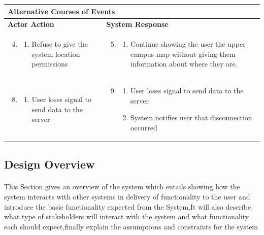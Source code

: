 \begin{longtable}{|p{}|p{}|}\hline
	\multicolumn{2}{|p{1.095\textwidth}|}{\textbf{Alternative Courses of Events}} \\\hline
	\textbf{Actor Action} & \textbf{System Response} \\\hline
	\begin{enumerate}
		\setcounter{enumi}{3}
		\item 
		\begin{enumerate}[series=abnormal0]
			\item Refuse to give the system location permissions
		\end{enumerate}
	\end{enumerate}
	&
	\begin{enumerate}[series=abnormal0]
		\setcounter{enumi}{4}
		\item
		\begin{enumerate}
			\item Continue showing the user the upper campus map without giving them information about where they are. 
		\end{enumerate}
	\end{enumerate} \\\hline
	\begin{enumerate}
		\setcounter{enumi}{7}
		\item 
		\begin{enumerate}[series=abnormal1]
			\item User loses signal to send data to the server
		\end{enumerate}
	\end{enumerate}
	&
	\begin{enumerate}
		\setcounter{enumi}{8}
		\item 
		\begin{enumerate}
			\item User loses signal to send data to the server
			\item System notifies user that disconnection occurred
		\end{enumerate}
	\end{enumerate} \\\hline
\end{longtable}

\subsection*{Design Overview}
\label{ss:design-overview}
\paragraph{}This Section gives an overview of the system which entails showing how the system interacts with other systems in delivery of functionality to the user and introduce the basic functionality expected from the System,It will also describe what type of stakeholders will interact with the system and what functionality each should expect,finally explain the assumptions and constraints for the system 

